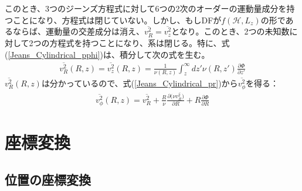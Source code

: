 このとき、3つのジーンズ方程式に対して6つの2次のオーダーの運動量成分を持つことになり、方程式は閉じていない。しかし、もしDFが$f(\mathcal{H}, L_z)$の形であるならば、運動量の交差成分は消え、$\overline{v_R^2}=\overline{v_z^2}$となり。このとき、2つの未知数に対して2つの方程式を持つことになり、系は閉じる。特に、式(\ref{Jeans_Cylindrical_pphi})は、積分して次の式を生む\cite{NM76}。
\begin{align}
	\overline{v_R^2}(R,z) = \overline{v_z^2}(R,z) = \frac{1}{\nu(R,z)}\int_z^\infty dz'\nu(R,z')\frac{\partial \Phi}{\partial z'}
\end{align}
$\overline{v_R^2}(R,z)$は分かっているので、式(\ref{Jeans_Cylindrical_pr})から$\overline{v_{\phi}^2}$を得る：
\begin{align}
	\overline{v_{\phi}^2}(R,z) = \overline{v_R^2} + \frac{R}{\nu}\frac{\partial (\nu \overline{v_R^2)}}{\partial R} + R\frac{\partial \Phi}{\partial R}
\end{align}



\section{座標変換}
\subsection{位置の座標変換}





